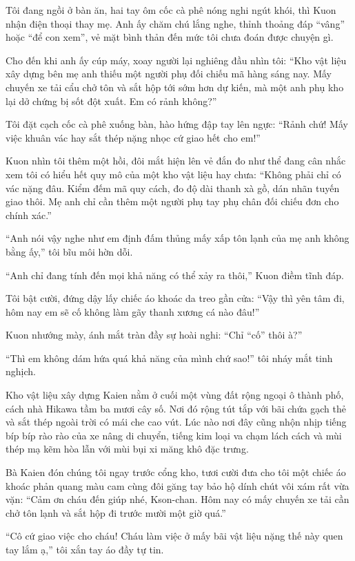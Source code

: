 ﻿\documentclass[../main.tex]{subfiles}
\begin{document}
Tôi đang ngồi ở bàn ăn, hai tay ôm cốc cà phê nóng nghi ngút khói, thì Kuon nhận điện thoại thay mẹ. Anh ấy chăm chú lắng nghe, thỉnh thoảng đáp ``vâng'' hoặc ``để con xem'', vẻ mặt bình thản đến mức tôi chưa đoán được chuyện gì.

Cho đến khi anh ấy cúp máy, xoay người lại nghiêng đầu nhìn tôi: ``Kho vật liệu xây dựng bên mẹ anh thiếu một người phụ đối chiếu mã hàng sáng nay. Mấy chuyến xe tải cẩu chở tôn và sắt hộp tới sớm hơn dự kiến, mà một anh phụ kho lại dở chứng bị sốt đột xuất. Em có rảnh không?''

Tôi đặt cạch cốc cà phê xuống bàn, hào hứng đập tay lên ngực: ``Rảnh chứ! Mấy việc khuân vác hay sắt thép nặng nhọc cứ giao hết cho em!''

Kuon nhìn tôi thêm một hồi, đôi mắt hiện lên vẻ đắn đo như thể đang cân nhắc xem tôi có hiểu hết quy mô của một kho vật liệu hay chưa: ``Không phải chỉ có vác nặng đâu. Kiểm đếm mã quy cách, đo độ dài thanh xà gồ, dán nhãn tuyến giao thôi. Mẹ anh chỉ cần thêm một người phụ tay phụ chân đối chiếu đơn cho chính xác.''

``Anh nói vậy nghe như em định đấm thủng mấy xấp tôn lạnh của mẹ anh không bằng ấy,'' tôi bĩu môi hờn dỗi.

``Anh chỉ đang tính đến mọi khả năng có thể xảy ra thôi,'' Kuon điềm tĩnh đáp.

Tôi bật cười, đứng dậy lấy chiếc áo khoác da treo gần cửa: ``Vậy thì yên tâm đi, hôm nay em sẽ cố không làm gãy thanh xương cá nào đâu!''

Kuon nhướng mày, ánh mắt tràn đầy sự hoài nghi: ``Chỉ ``cố'' thôi à?''

``Thì em không dám hứa quá khả năng của mình chứ sao!'' tôi nháy mắt tinh nghịch.

\ct

Kho vật liệu xây dựng Kaien nằm ở cuối một vùng đất rộng ngoại ô thành phố, cách nhà Hikawa tầm ba mươi cây số. Nơi đó rộng tút tắp với bãi chứa gạch thẻ và sắt thép ngoài trời có mái che cao vút. Lúc nào nơi đây cũng nhộn nhịp tiếng bíp bíp rào rào của xe nâng di chuyển, tiếng kim loại va chạm lách cách và mùi thép mạ kẽm hòa lẫn với mùi bụi xi măng khô đặc trưng.

Bà Kaien đón chúng tôi ngay trước cổng kho, tươi cười đưa cho tôi một chiếc áo khoác phản quang màu cam cùng đôi găng tay bảo hộ dính chút vôi xám rất vừa vặn: ``Cảm ơn cháu đến giúp nhé, Kson-chan. Hôm nay có mấy chuyến xe tải cần chở tôn lạnh và sắt hộp đi trước mười một giờ quá.''

``Cô cứ giao việc cho cháu! Cháu làm việc ở mấy bãi vật liệu nặng thế này quen tay lắm ạ,'' tôi xắn tay áo đầy tự tin.
\end{document}
